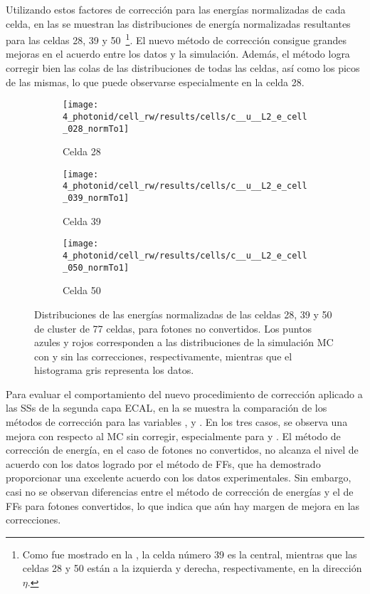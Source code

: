 Utilizando estos factores de corrección para las energías normalizadas de cada celda, en las \Fig{\ref{fig:ss_corrections:cell_rw:results:cells}} se muestran las distribuciones de energía normalizadas resultantes para las celdas 28, 39 y 50~\footnote{Como fue mostrado en la \Fig{\ref{fig:ss_corrections:cell_rw:event_selection:cluster:arrangement}}, la celda número 39 es la central, mientras que las celdas 28 y 50 están a la izquierda y derecha, respectivamente, en la dirección \(\eta\).}. El nuevo método de correcci\'on consigue grandes mejoras en el acuerdo entre los datos y la simulaci\'on. Adem\'as, el m\'etodo logra corregir bien las colas de las distribuciones de todas las celdas, así como los picos de las mismas, lo que puede observarse especialmente en la celda 28.

\begin{figure}[ht!]
    \centering
    \begin{subfigure}[h]{0.32\linewidth}
        \centering
        \texttt{[image: 4\_photonid/cell\_rw/results/cells/c\_\_u\_\_L2\_e\_cell\_028\_normTo1]}
        \caption{Celda 28}
    \end{subfigure}
    \hfill
    \begin{subfigure}[h]{0.32\linewidth}
        \centering
        \texttt{[image: 4\_photonid/cell\_rw/results/cells/c\_\_u\_\_L2\_e\_cell\_039\_normTo1]}
        \caption{Celda 39}
    \end{subfigure}
    \hfill
    \begin{subfigure}[h]{0.32\linewidth}
        \centering
        \texttt{[image: 4\_photonid/cell\_rw/results/cells/c\_\_u\_\_L2\_e\_cell\_050\_normTo1]}
        \caption{Celda 50}
    \end{subfigure}
    \caption{Distribuciones de las energ\'ias normalizadas de las celdas 28, 39 y 50 de cluster de 77 celdas, para fotones no convertidos. Los puntos azules y rojos corresponden a las distribuciones de la simulaci\'on \ac{MC} con y sin las correcciones, respectivamente, mientras que el histograma gris representa los datos.}
    \label{fig:ss_corrections:cell_rw:results:cells}
\end{figure}



Para evaluar el comportamiento del nuevo procedimiento de correcci\'on aplicado a las \acp{SS} de la segunda capa \ac{ECAL}, en la \Fig{\ref{fig:ss_corrections:cell_rw:results:ss}} se muestra la comparación de los métodos de corrección para las variables \reta, \rphi y \weta. En los tres casos, se observa una mejora con respecto al \ac{MC} sin corregir, especialmente para \rphi y \weta. El método de correcci\'on de energía, en el caso de fotones no convertidos, no alcanza el nivel de acuerdo con los datos logrado por el m\'etodo de \acp{FF}, que ha demostrado proporcionar una excelente acuerdo con los datos experimentales. Sin embargo, casi no se observan diferencias entre el método de correcci\'on de energ\'ias y el de \acp{FF} para fotones convertidos, lo que indica que a\'un hay margen de mejora en las correcciones.


